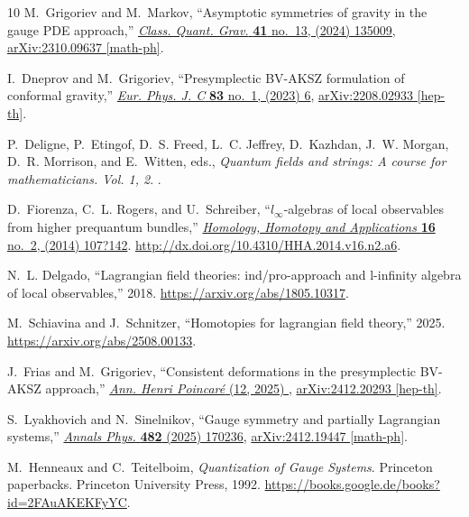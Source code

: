 \documentclass[a4paper,12pt]{article}
\numberwithin{equation}{section} %
\begin{document}
\begin{thebibliography}{10}
M.~Grigoriev and M.~Markov, ``{Asymptotic symmetries of gravity in the gauge PDE approach},'' \href{http://dx.doi.org/10.1088/1361-6382/ad4ae0}{{\em Class. Quant. Grav.} {\bfseries 41} no.~13, (2024) 135009}, \href{http://arxiv.org/abs/2310.09637}{{\ttfamily arXiv:2310.09637 [math-ph]}}.

I.~Dneprov and M.~Grigoriev, ``{Presymplectic BV-AKSZ formulation of conformal gravity},'' \href{http://dx.doi.org/10.1140/epjc/s10052-022-11082-6}{{\em Eur. Phys. J. C} {\bfseries 83} no.~1, (2023) 6}, \href{http://arxiv.org/abs/2208.02933}{{\ttfamily arXiv:2208.02933 [hep-th]}}.

P.~Deligne, P.~Etingof, D.~S. Freed, L.~C. Jeffrey, D.~Kazhdan, J.~W. Morgan, D.~R. Morrison, and E.~Witten, eds., {\em {Quantum fields and strings: A course for mathematicians. Vol. 1, 2}}.
.

D.~Fiorenza, C.~L. Rogers, and U.~Schreiber, ``$l_{\infty}$-algebras of local observables from higher prequantum bundles,'' \href{http://dx.doi.org/10.4310/hha.2014.v16.n2.a6}{{\em Homology, Homotopy and Applications} {\bfseries 16} no.~2, (2014) 107?142}. \url{http://dx.doi.org/10.4310/HHA.2014.v16.n2.a6}.

N.~L. Delgado, ``Lagrangian field theories: ind/pro-approach and l-infinity algebra of local observables,'' 2018.
\newblock \url{https://arxiv.org/abs/1805.10317}.

M.~Schiavina and J.~Schnitzer, ``Homotopies for lagrangian field theory,'' 2025.
\newblock \url{https://arxiv.org/abs/2508.00133}.

J.~Frias and M.~Grigoriev, ``{Consistent deformations in the presymplectic BV-AKSZ approach},'' \href{http://dx.doi.org/10.1007/s00023-025-01628-1}{{\em Ann. Henri Poincaré} (12, 2025) }, \href{http://arxiv.org/abs/2412.20293}{{\ttfamily arXiv:2412.20293 [hep-th]}}.

S.~Lyakhovich and N.~Sinelnikov, ``{Gauge symmetry and partially Lagrangian systems},'' \href{http://dx.doi.org/10.1016/j.aop.2025.170236}{{\em Annals Phys.} {\bfseries 482} (2025) 170236}, \href{http://arxiv.org/abs/2412.19447}{{\ttfamily arXiv:2412.19447 [math-ph]}}.

M.~Henneaux and C.~Teitelboim, {\em Quantization of Gauge Systems}.
\newblock Princeton paperbacks. Princeton University Press, 1992.
\newblock \url{https://books.google.de/books?id=2FAuAKEKFyYC}.


\end{thebibliography}
\end{document}
